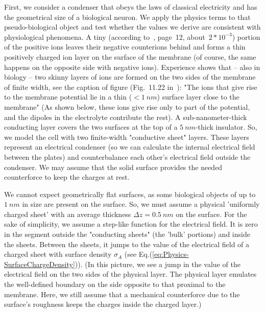First, we consider a condenser that obeys 
the laws of classical electricity and has 
the geometrical size of a biological neuron.
We apply the physics terms to that pseudo-biological object
and test whether the values we derive are consistent with physiological phenomena. A tiny (according to~\cite{JohnstonWuNeurophysiology:1995}, page~12, about~$2*10^{-3}$) portion of the positive ions leaves their negative
counterions behind and forms a thin positively charged ion layer on the surface of the membrane (of course, the same happens on the opposite side with negative ions). Experience shows that -- also in biology -- two skinny layers of ions are formed on the two sides of the membrane of finite width, %
{see the caption of figure (Fig.~11.22 in~\cite{MolecularBiology:2002})}:
"The ions that give rise to the membrane potential lie
in a thin ($< 1\ nm$) surface layer close to the membrane"
(As shown below, these ions give rise only to part of the
potential, and the dipoles in the electrolyte contribute the rest).
A sub-nanometer-thick conducting layer covers the two surfaces at the top of a $ 5~nm$-thick insulator. 
So, we model the cell with two finite-width "conductive sheet" layers.
These layers represent an electrical condenser (so we can calculate the internal electrical field between the plates) and counterbalance each other's electrical field outside the condenser.
We may assume that the solid surface provides the needed
counterforce to keep the charges at rest.

\else

\fi



\ifx\magyar\undefined
We cannot expect geometrically flat surfaces, as some biological objects of up to $1~nm$ in size are present on the surface.
So, we must assume
a physical 'uniformly charged sheet' with an average thickness $\Delta z=0.5~nm$ on the surface.
For the sake of simplicity, we assume a step-like function
for the electrical field. It is zero in the segment outside 
the "conducting sheets" (the 'bulk' portions) and inside the sheets.  Between the sheets, it jumps to the value of the electrical field of a charged sheet with surface density $\sigma_A$ (see Eq.(\ref{eq:Physics-SurfaceChargeDensity})).
(In this picture, we see a jump in the value of the electrical field
on the two sides of the physical layer. The physical layer emulates the well-defined boundary
on the side opposite to that proximal to the membrane. Here, we still assume that a mechanical counterforce due to the surface's roughness keeps the charges inside the charged layer.)

